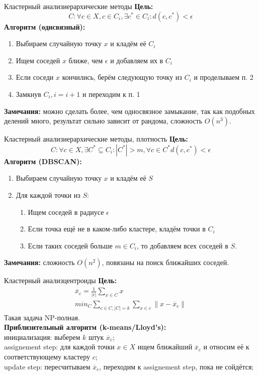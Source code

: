 \documentclass[14pt, fleqn, xcolor={dvipsnames, table}]{beamer}
\begin{document}
\begin{frame}{Кластерный анализ}{иерархические методы}
\small
\textbf{Цель:}
$$
  C: \forall c \in X, c \in C_i, \exists c^* \in C_i : d(c, c^*) < \epsilon
$$
\textbf{Алгоритм (однсвязный):}
\begin{enumerate}
  \item Выбираем случайную точку $x$ и кладём её $C_i$
  \item Ищем соседей $x$ ближе, чем $\epsilon$ и добавляем их в $C_i$
  \item Если соседи $x$ кончились, берём следующую точку из $C_i$ и проделываем п. 2
  \item Замкнув $C_i, i = i+1$ и переходим к п. 1
\end{enumerate}
\textbf{Замечания:} можно сделать более, чем односвязное замыкание, так как подобных делений много, результат сильно зависит от рандома, сложность $O(n^3)$.
\end{frame}

\begin{frame}{Кластерный анализ}{иерархические методы, плотность}
\small
\textbf{Цель:}
$$
  C: \forall c \in X, \exists C^* \subseteq C_i: |C^*| > m, \forall c \in C^* d(c, c^*) < \epsilon
$$
\textbf{Алгоритм (DBSCAN):}
\begin{enumerate}
  \item Выбираем случайную точку $x$ и кладём её $S$
  \item Для каждой точки из $S$:
  \begin{enumerate}
    \item Ищем соседей в радиусе $\epsilon$
    \item Если точка ещё не в каком-либо кластере, кладём точки в $C_i$
    \item Если таких соседей больше $m \in C_i$, то добавляем всех соседей в $S$. 
  \end{enumerate}
  
\end{enumerate}
\textbf{Замечания:} сложность $O(n^2)$, повязаны на поиск ближайших соседей.
\end{frame}

\begin{frame}{Кластерный анализ}{центроиды}
\small
\textbf{Цель:}
$$\begin{array}{l}
  \overline{x}_c = \frac{1}{|c|}\sum_{x \in C} x \\
  min_C \sum_{c \in C, |C| = k} \sum_{x \in c} \|x - \overline{x}_c\|
\end{array}$$
Такая задача NP-полная. \\
\textbf{Приблизительный алгоритм (k-means/Lloyd's):} \\
{\color{blue}инициализация:} выберем $k$ штук $\overline{x}_c$; \\
{\color{blue}assignement step:} для каждой точки $x \in X$ ищем ближайший $\overline{x}_c$ и относим её к соответствующему кластеру $c$; \\
{\color{blue}update step:} пересчитываем $\overline{x}_c$, переходим к assignement step, пока не сойдётся; \\
\end{frame}
\end{document}
